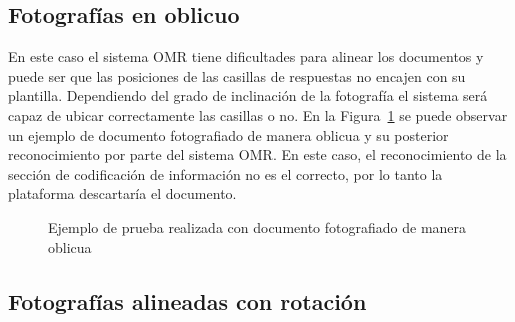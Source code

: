 \documentclass[a4paper, 12pt]{book}
\begin{document}
\subsection{Fotografías en oblicuo}
\label{subsec:fotografias_oblicuo}

En este caso el sistema OMR tiene dificultades para alinear los documentos
y puede ser que las posiciones de las casillas de respuestas no encajen
con su plantilla. Dependiendo del grado de inclinación de la fotografía
el sistema será capaz de ubicar correctamente las casillas o no.
En la Figura~\ref{figura:test3} se puede observar un ejemplo
de documento fotografiado de manera oblicua y su posterior
reconocimiento por parte
del sistema OMR. En este caso, el reconocimiento de la sección de
codificación de información no es el correcto, por lo tanto la
plataforma descartaría el documento.

\begin{figure}
  \centering
  \caption{Ejemplo de prueba realizada con documento fotografiado de manera oblicua}
  \label{figura:test3}
\end{figure}

\subsection{Fotografías alineadas con rotación}
\label{subsec:fotografias_rotación}
\end{document}
